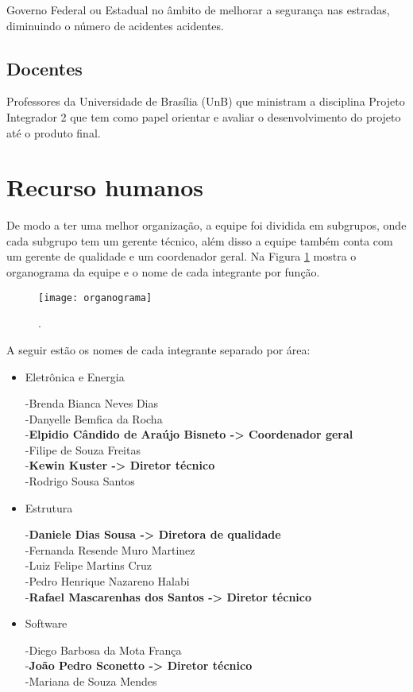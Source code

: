 Governo Federal ou Estadual no âmbito de melhorar a segurança nas estradas, diminuindo o número de acidentes acidentes. 

\subsection {Docentes}

Professores da Universidade de Brasília (UnB) que ministram a disciplina Projeto Integrador 2 que tem como papel orientar e avaliar o desenvolvimento do projeto até o produto final.

\section{Recurso humanos}

 De modo a ter uma melhor organização, a equipe foi dividida em subgrupos, onde cada subgrupo tem um gerente técnico, além disso a equipe também conta com um gerente de qualidade e um coordenador geral. Na Figura \ref{fig:organograma} mostra o organograma da equipe e o nome de cada integrante por função.
 
\begin{figure}[h]
\centering
\texttt{[image: organograma]}
\caption{.}\label{fig:organograma}
\end{figure} 

A seguir estão os nomes de cada integrante separado por área:

\begin{itemize}
\item Eletrônica e Energia

-Brenda Bianca Neves Dias\\
-Danyelle Bemfica da Rocha\\
-\textbf{Elpidio Cândido de Araújo Bisneto -> Coordenador geral}\\
-Filipe de Souza Freitas\\
-\textbf{Kewin Kuster -> Diretor técnico}\\
-Rodrigo Sousa Santos

\item Estrutura

-\textbf{Daniele Dias Sousa -> Diretora de qualidade}\\
-Fernanda Resende Muro Martinez\\
-Luiz Felipe Martins Cruz\\
-Pedro Henrique Nazareno Halabi\\
-\textbf{Rafael Mascarenhas dos Santos -> Diretor técnico}

\item Software

-Diego Barbosa da Mota França\\
-\textbf{João Pedro Sconetto -> Diretor técnico}\\
-Mariana de Souza Mendes 


\end{itemize}

